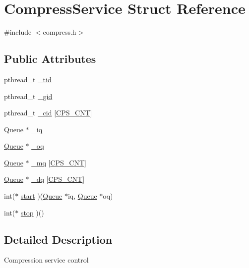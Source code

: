 \hypertarget{structCompressService}{\section{\-Compress\-Service \-Struct \-Reference}
\label{structCompressService}
}


{\ttfamily \#include $<$compress.\-h$>$}

\subsection*{\-Public \-Attributes}
\begin{DoxyCompactItemize}
\item 
pthread\-\_\-t \hyperlink{structCompressService_ac4bdc8605d790886af89c35f63b3cf30}{\-\_\-tid}
\item 
pthread\-\_\-t \hyperlink{structCompressService_a71c80458913f442d0572d9dc6ecc01a2}{\-\_\-gid}
\item 
pthread\-\_\-t \hyperlink{structCompressService_ac1792be4297e02ba1aed8a71f29e2b5a}{\-\_\-cid} \mbox{[}\hyperlink{revdedup_8h_a9ca444fac49736b7a8321329b3c9d819}{\-C\-P\-S\-\_\-\-C\-N\-T}\mbox{]}
\item 
\hyperlink{structQueue}{\-Queue} $\ast$ \hyperlink{structCompressService_ada5072ad1b06d04d69ce7e379250c5c5}{\-\_\-iq}
\item 
\hyperlink{structQueue}{\-Queue} $\ast$ \hyperlink{structCompressService_a776fb7eb7b634352f27e24cd621d5667}{\-\_\-oq}
\item 
\hyperlink{structQueue}{\-Queue} $\ast$ \hyperlink{structCompressService_a3153dd0416c747d474480d83d23d3d76}{\-\_\-mq} \mbox{[}\hyperlink{revdedup_8h_a9ca444fac49736b7a8321329b3c9d819}{\-C\-P\-S\-\_\-\-C\-N\-T}\mbox{]}
\item 
\hyperlink{structQueue}{\-Queue} $\ast$ \hyperlink{structCompressService_a8f225d532b28a32fb4de849ba6a54def}{\-\_\-dq} \mbox{[}\hyperlink{revdedup_8h_a9ca444fac49736b7a8321329b3c9d819}{\-C\-P\-S\-\_\-\-C\-N\-T}\mbox{]}
\item 
int($\ast$ \hyperlink{structCompressService_adfdf8ef15576011f859f36a69f77ace5}{start} )(\hyperlink{structQueue}{\-Queue} $\ast$iq, \hyperlink{structQueue}{\-Queue} $\ast$oq)
\item 
int($\ast$ \hyperlink{structCompressService_a14b29cd7fd8ed18555749fbbeda609b9}{stop} )()
\end{DoxyCompactItemize}


\subsection{\-Detailed \-Description}
\-Compression service control 

